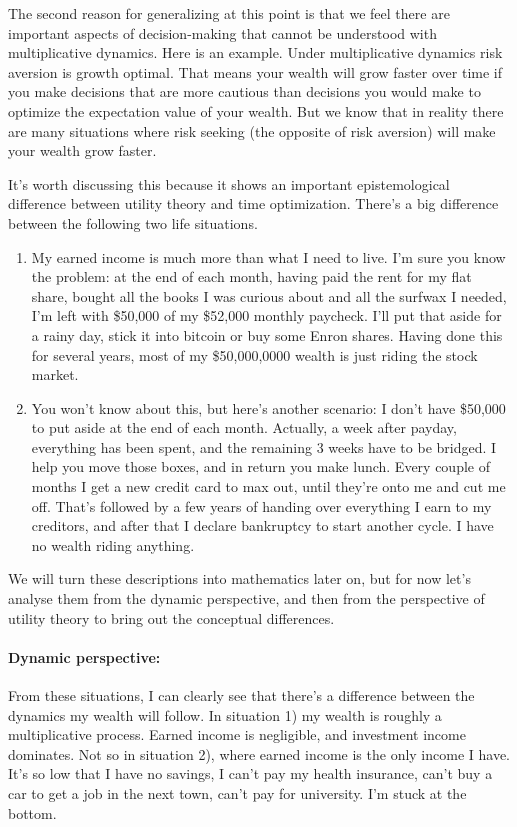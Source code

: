 The second reason for generalizing at this point is that we feel there are important aspects of 
decision-making that cannot be understood with multiplicative dynamics. Here is an example. 
Under multiplicative dynamics risk aversion is growth optimal. That means your wealth will 
grow faster over time if you make decisions that are more cautious than decisions you would 
make to optimize the expectation value of your wealth. But we know that in reality there are 
many situations where risk seeking (the opposite of risk aversion) will make your wealth grow faster. 

It's worth discussing this because it shows an important epistemological difference between 
utility theory and time optimization. There's a big difference between the following two life 
situations. 
\begin{enumerate}
\item My earned income is much more than what I need to live. I'm sure you know the 
problem: at the end of each month, having paid the rent for my flat share, bought all the 
books I was curious about and all the surfwax I needed, I'm left with \$50,000 of my \$52,000 
monthly paycheck. I'll put that aside for a rainy day, stick it into bitcoin or buy some Enron 
shares. Having done this for several years, most of my \$50,000,0000 wealth is just riding the 
stock market. 
\item You won't know about this, but here's another scenario: I don't have \$50,000 to put aside 
at the end of each month. Actually, a week after payday, everything has been spent, and the 
remaining 3 weeks have to be bridged. I help you move those boxes, and in return you make lunch. 
Every couple of months I get a new credit card to max out, until they're onto me and cut me 
off. That's followed by a few years of handing over everything I earn to my creditors, and 
after that I declare bankruptcy to start another cycle. I have no wealth riding anything.
\end{enumerate}

We will turn these descriptions into mathematics later on, but for now let's analyse them from the dynamic perspective, and then from the perspective of utility theory to bring out the conceptual differences.

\paragraph{\bf Dynamic perspective:}
From these situations, I can clearly see that there's a difference between the dynamics my wealth 
will follow. In situation 1) my wealth is roughly a multiplicative process. Earned income is 
negligible, and investment income dominates. Not so in situation 2), where earned income is the 
only income I have. It's so low that I have no savings, I can't pay my health insurance, can't buy a 
car to get a job in the next town, can't pay for university. I'm stuck at the bottom. 

